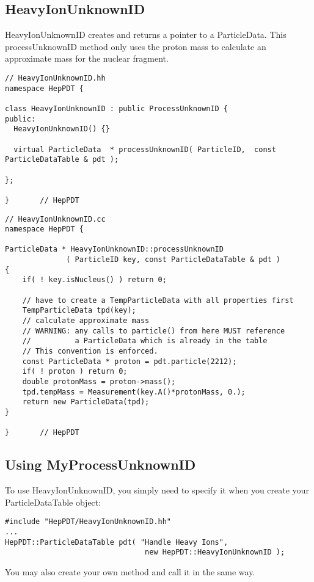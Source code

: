 \subsection { HeavyIonUnknownID }

HeavyIonUnknownID creates and returns a pointer to a ParticleData.
This processUnknownID method only uses the proton mass to calculate
an approximate mass for the nuclear fragment.

\begin{verbatim}
// HeavyIonUnknownID.hh
namespace HepPDT {

class HeavyIonUnknownID : public ProcessUnknownID {
public:
  HeavyIonUnknownID() {}

  virtual ParticleData  * processUnknownID( ParticleID,  const ParticleDataTable & pdt );
    
};

}       // HepPDT

\end{verbatim}

\begin{verbatim}
// HeavyIonUnknownID.cc
namespace HepPDT {

ParticleData * HeavyIonUnknownID::processUnknownID
              ( ParticleID key, const ParticleDataTable & pdt ) 
{ 
    if( ! key.isNucleus() ) return 0;
     
    // have to create a TempParticleData with all properties first
    TempParticleData tpd(key);
    // calculate approximate mass
    // WARNING: any calls to particle() from here MUST reference 
    //          a ParticleData which is already in the table
    // This convention is enforced.
    const ParticleData * proton = pdt.particle(2212);
    if( ! proton ) return 0;
    double protonMass = proton->mass();
    tpd.tempMass = Measurement(key.A()*protonMass, 0.);
    return new ParticleData(tpd);
}

}       // HepPDT

\end{verbatim}


\subsection { Using MyProcessUnknownID }

To use HeavyIonUnknownID, you simply need to specify it when you
create your ParticleDataTable object: 
\begin{verbatim}
#include "HepPDT/HeavyIonUnknownID.hh"
...
HepPDT::ParticleDataTable pdt( "Handle Heavy Ions", 
                                new HepPDT::HeavyIonUnknownID );
\end{verbatim}

You may also create your own method and call it in the same way.


\vfill\eject
